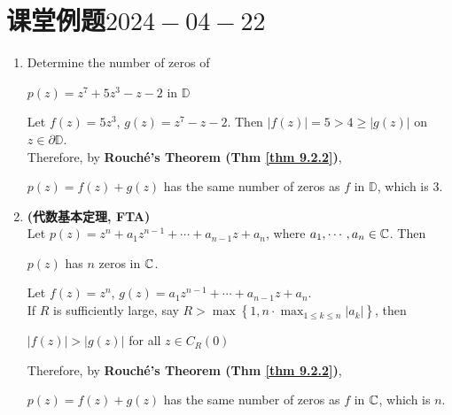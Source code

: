\section{课堂例题$2024-04-22$}
	\begin{enumerate}
		\item Determine the number of zeros of
		\begin{center}
			$p(z) = z^7 + 5z^3 - z - 2$ in $\mathbb{D}$
		\end{center}
	
		\vspace{2em}
		\begin{solution}
			Let $f(z) = 5z^3$, $g(z) = z^7 - z - 2$. Then $\left| f(z) \right| = 5 > 4 \geq \left| g(z) \right|$ on $z \in \partial \mathbb{D}$. \\
			Therefore, by \textbf{Rouch\'{e}'s Theorem (Thm \ref{thm 9.2.2})},
			\begin{center}
				$p(z) = f(z) + g(z)$ has the same number of zeros as $f$ in $\mathbb{D}$, which is 3.
			\end{center}
		\end{solution}
	
		\vspace{6em}
		
		\item \textbf{(代数基本定理, FTA)} \\
		Let $p(z) = z^n + a_1 z^{n - 1} + \cdots + a_{n - 1}z + a_n$, where $a_1 , \cdots , a_n \in \mathbb{C}$. Then
		\begin{center}
			$p(z)$ has $n$ zeros in $\mathbb{C}$.
		\end{center}
	
		\vspace{2em}
		\begin{solution}
			Let $f(z) = z^n$, $g(z) = a_1 z^{n - 1} + \cdots + a_{n - 1} z + a_n$. \\
			If $R$ is sufficiently large, say $R > \max{\left\{ 1 , n \cdot \max_{1 \leq k \leq n}{\left| a_k \right|} \right\}}$, then
			\begin{center}
				$\left| f(z) \right| > \left| g(z) \right|$ for all $z \in C_{R}(0)$
			\end{center}
			Therefore, by \textbf{Rouch\'{e}'s Theorem (Thm \ref{thm 9.2.2})},
			\begin{center}
				$p(z) = f(z) + g(z)$ has the same number of zeros as $f$ in $\mathbb{C}$, which is $n$.
			\end{center}
		\end{solution}
	

\end{enumerate}
